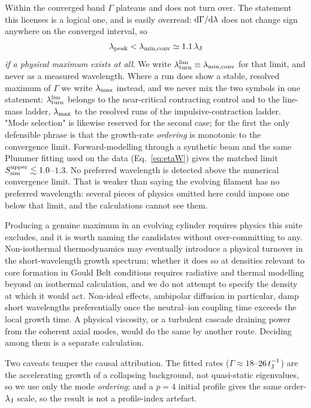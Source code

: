 \documentclass[usenatbib,twoside,twocolumn]{mnras}
\begin{document}
Within the converged band $\Gamma$ plateaus and does not turn over. The statement this licenses is a logical one, and is easily overread: ${\rm d}\Gamma/{\rm d}\lambda$ does not change sign anywhere on the converged interval, so
\begin{equation}
\lambda_{\rm peak}<\lambda_{\rm min,conv}\simeq1.1\,\lambda_{\rm J}
\label{eq:bound}
\end{equation}
\emph{if a physical maximum exists at all}. We write $\lambda_{\rm turn}^{\rm lim}\equiv\lambda_{\rm min,conv}$ for that limit, and never as a measured wavelength. Where a run does show a stable, resolved maximum of $\Gamma$ we write $\lambda_{\rm max}$ instead, and we never mix the two symbols in one statement: $\lambda_{\rm turn}^{\rm lim}$ belongs to the near-critical contracting control and to the line-mass ladder, $\lambda_{\rm max}$ to the resolved runs of the impulsive-contraction ladder. "Mode selection" is likewise reserved for the second case; for the first the only defensible phrase is that the growth-rate \emph{ordering} is monotonic to the convergence limit. Forward-modelling through a synthetic beam and the same Plummer fitting used on the data (Eq.~\ref{eq:etaW}) gives the matched limit $S_{\rm sim}^{\rm upper}\lesssim1.0$--$1.3$. No preferred wavelength is detected above the numerical convergence limit. That is weaker than saying the evolving filament has no preferred wavelength: several pieces of physics omitted here could impose one below that limit, and the calculations cannot see them.

Producing a genuine maximum in an evolving cylinder requires physics this suite excludes, and it is worth naming the candidates without over-committing to any. Non-isothermal thermodynamics may eventually introduce a physical turnover in the short-wavelength growth spectrum; whether it does so at densities relevant to core formation in Gould Belt conditions requires radiative and thermal modelling beyond an isothermal calculation, and we do not attempt to specify the density at which it would act. Non-ideal effects, ambipolar diffusion in particular, damp short wavelengths preferentially once the neutral--ion coupling time exceeds the local growth time. A physical viscosity, or a turbulent cascade draining power from the coherent axial modes, would do the same by another route. Deciding among them is a separate calculation.

Two caveats temper the causal attribution. The fitted rates ($\Gamma\approx18$--$26\,t_{\rm J}^{-1}$) are the accelerating growth of a collapsing background, not quasi-static eigenvalues, so we use only the mode \emph{ordering}; and a $p=4$ initial profile gives the same order-$\lambda_{\rm J}$ scale, so the result is not a profile-index artefact.
\end{document}
